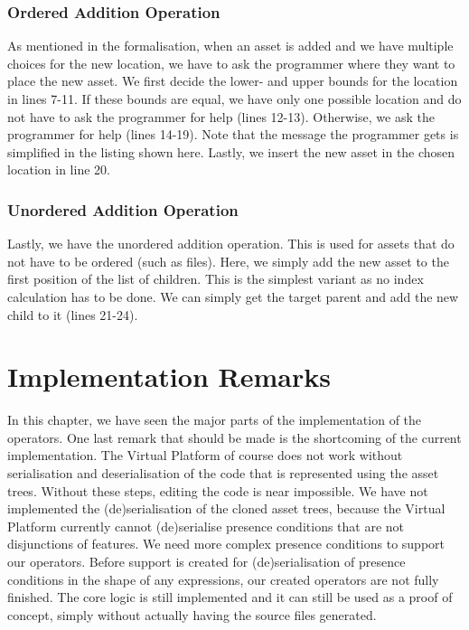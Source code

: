 \subsubsection*{Ordered Addition Operation}
As mentioned in the formalisation, when an asset is added and we have multiple choices
for the new location, we have to ask the programmer where they want to place the new
asset. We first decide the lower- and upper bounds for the location in lines 7-11. If 
these bounds are equal, we have only one possible location and do not have to ask the
programmer for help (lines 12-13). Otherwise, we ask the programmer for help (lines 14-19).
Note that the message the programmer gets is simplified in the listing shown here. Lastly,
we insert the new asset in the chosen location in line 20.

\subsubsection*{Unordered Addition Operation}
Lastly, we have the unordered addition operation. This is used for assets that do not have
to be ordered (such as files). Here, we simply add the new asset to the first position of
the list of children. This is the simplest variant as no index calculation has to be done.
We can simply get the target parent and add the new child to it (lines 21-24).

\section{Implementation Remarks}
In this chapter, we have seen the major parts of the implementation of the operators.
One last remark that should be made is the shortcoming of the current implementation.
The Virtual Platform of course does not work without serialisation and deserialisation
of the code that is represented using the asset trees. Without these steps, editing the
code is near impossible. We have not implemented the (de)serialisation of the cloned
asset trees, because the Virtual Platform currently cannot (de)serialise presence
conditions that are not disjunctions of features. We need more complex presence conditions
to support our operators. Before support is created for (de)serialisation of presence
conditions in the shape of any expressions, our created operators are not fully finished.
The core logic is still implemented and it can still be used as a proof of concept, simply
without actually having the source files generated.

